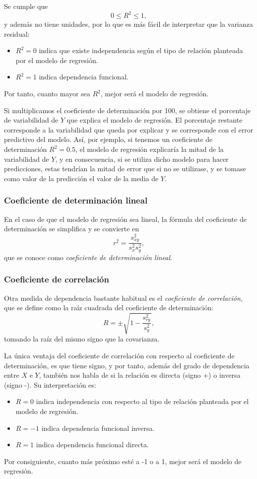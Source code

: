 Se cumple que
\[ 0\leq R^2\leq 1,\]
y además no tiene unidades, por lo que es más fácil de interpretar que la varianza residual:
\begin{itemize}
\item $R^2=0$ indica que existe independencia según el tipo de relación planteada por el modelo de regresión.
\item $R^2=1$ indica dependencia funcional.
\end{itemize}
Por tanto, cuanto mayor sea $R^2$, mejor será el modelo de regresión.

Si multiplicamos el coeficiente de determinación por 100, se obtiene el porcentaje de variabilidad de $Y$ que explica el
modelo de regresión.
El porcentaje restante corresponde a la variabilidad que queda por explicar y se corresponde con el error predictivo del
modelo.
Así, por ejemplo, si tenemos un coeficiente de determinación $R^2=0.5$, el modelo de regresión explicaría la mitad de la
variabilidad de $Y$, y en consecuencia, si se utiliza dicho modelo para hacer predicciones, estas tendrían la mitad de
error que si no se utilizase, y se tomase como valor de la predicción el valor de la media de $Y$.

\subsubsection{Coeficiente de determinación lineal}
En el caso de que el modelo de regresión sea lineal, la fórmula del coeficiente de determinación se simplifica y se
convierte en
\[
r^2=\frac{s_{xy}^2}{s_x^2 s_y^2},
\]
que se conoce como \emph{coeficiente de determinación lineal}.

\subsubsection{Coeficiente de correlación}
Otra medida de dependencia bastante habitual es el \emph{coeficiente de correlación}, que se define como la raíz
cuadrada del coeficiente de determinación:
\[
R=\pm\sqrt{1-\frac{s^2_{ry}}{s_y^2}},
\]
tomando la raíz del mismo signo que la covarianza.

La única ventaja del coeficiente de correlación con respecto al coeficiente de determinación, es que tiene signo, y por
tanto, además del grado de dependencia entre $X$ e $Y$, también nos habla de si la relación es directa (signo +) o
inversa (signo -). 
Su interpretación es:
\begin{itemize}
\item $R=0$ indica independencia con respecto al tipo de relación planteada por el modelo de
regresión.
\item $R=-1$ indica dependencia funcional inversa.
\item $R=1$ indica dependencia funcional directa.
\end{itemize}
Por consiguiente, cuanto más próximo esté a -1 o a 1, mejor será el modelo de regresión.


